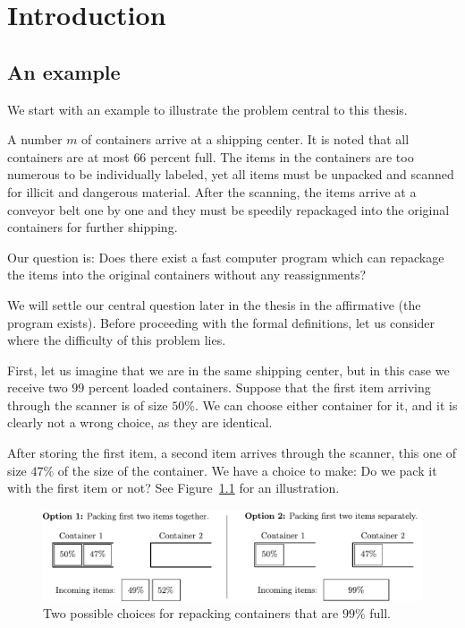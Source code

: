 \chapter{Introduction}\label{chap:intro}

\section{An example}\label{sec:example}

We start with an example to illustrate the problem central to this thesis.

A number $m$ of containers arrive at a shipping center. It is noted
that all containers are at most $66$ percent full. The items in the
containers are too numerous to be individually labeled, yet all items
must be unpacked and scanned for illicit and dangerous material. After
the scanning, the items arrive at a conveyor belt one by one and they must
be speedily repackaged into the original containers for further shipping.

Our question is: Does there exist a fast computer program which can
repackage the items into the original containers without any
reassignments?

We will settle our central question later in the thesis in the
affirmative (the program exists). Before proceeding with the formal
definitions, let us consider where the difficulty of this problem
lies.

First, let us imagine that we are in the same shipping center, but in
this case we receive two $99$ percent loaded containers. Suppose that
the first item arriving through the scanner is of size $50\%$. We can
choose either container for it, and it is clearly not a wrong choice,
as they are identical.

After storing the first item, a second item arrives through the
scanner, this one of size $47\%$ of the size of the container. We have
a choice to make: Do we pack it with the first item or not? See
Figure~\ref{fig:ninetynine} for an illustration.

\begin{figure}[th]
\begin{center}
\includegraphics[width=\textwidth]{img/ninetynine.pdf}
\end{center}
\caption{Two possible choices for repacking containers that are $99\%$ full.}
\label{fig:ninetynine}
\end{figure}


